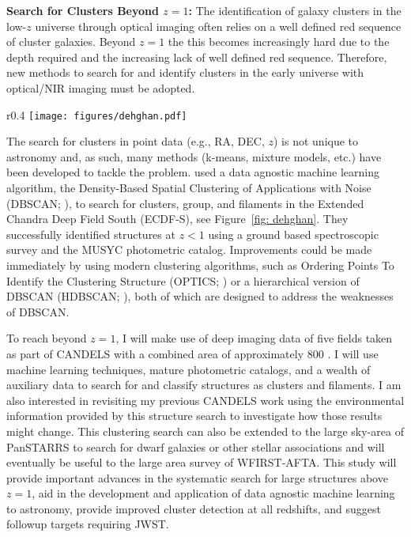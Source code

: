 \documentclass[overlapped, line, 11pt]{res}
\newcommand{\eg}{e.g.}
\begin{document}
\begin{resume}
\noindent \textbf{Search for Clusters Beyond $z=1$:} The identification of galaxy clusters in the low-$z$ universe through optical imaging often relies on a well defined red sequence of cluster galaxies. Beyond $z=1$ the this becomes increasingly hard due to the depth required and the increasing lack of well defined red sequence. Therefore, new methods to search for and identify clusters in the early universe with optical/NIR imaging must be adopted.

\begin{wrapfigure}[18]{r}{0.4\textwidth}
	\vspace*{-1.cm}
	\centering
	\texttt{[image: figures/dehghan.pdf]}
	\vspace*{-0.75cm}
	\caption{Potential structures detected at $0.65 < z < 0.7$ in the ECDF-S. Colored points show potential clusters whereas black points show galaxies classified as noise.}
	\label{fig: dehghan}
\end{wrapfigure}

The search for clusters in point data (\eg, RA, DEC, $z$) is not unique to astronomy and, as such, many methods (k-means, mixture models, etc.) have been developed to tackle the problem. \cite{Dehghan2014} used a data agnostic machine learning algorithm, the Density-Based Spatial Clustering of Applications with Noise (DBSCAN; \citealt{Ester1996}), to search for clusters, group, and filaments in the Extended Chandra Deep Field South (ECDF-S), see Figure~\ref{fig: dehghan}. They successfully identified structures at $z<1$ using a ground based spectroscopic survey and the MUSYC photometric catalog. Improvements could be made immediately by using modern clustering algorithms, such as Ordering Points To Identify the Clustering Structure (OPTICS; \citealt{Ankerst1999}) or a hierarchical version of DBSCAN (HDBSCAN; \citealt{Campello2013}), both of which are designed to address the weaknesses of DBSCAN.

To reach beyond $z=1$, I will make use of deep imaging data of five fields taken as part of CANDELS with a combined area of approximately 800 \arcminsq. I will use machine learning techniques, mature photometric catalogs, and a wealth of auxiliary data to search for and classify structures as clusters and filaments. I am also interested in revisiting my previous CANDELS work \citep{Boada2015} using the environmental information provided by this structure search to investigate how those results might change. This clustering search can also be extended to the large sky-area of PanSTARRS to search for dwarf galaxies or other stellar associations and will eventually be useful to the large area survey of WFIRST-AFTA. This study will provide important advances in the systematic search for large structures above $z=1$, aid in the development and application of data agnostic machine learning to astronomy, provide improved cluster detection at all redshifts, and suggest followup targets requiring JWST.


\end{resume}
\end{document}
